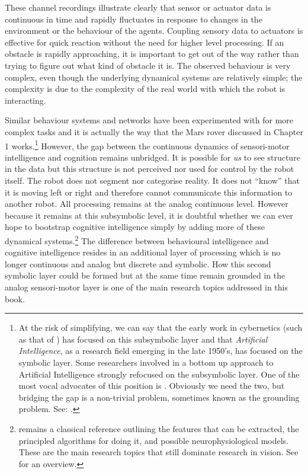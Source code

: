 These channel recordings illustrate clearly that sensor or actuator
data is continuous in time and 
rapidly fluctuates in response to changes in the environment or the
behaviour of the agents. Coupling sensory data to actuators
is effective for quick reaction
without the need for higher level processing. If 
an obstacle is rapidly approaching, it is important to get out 
of the way rather than trying to figure out what kind of 
obstacle it is. The observed behaviour is very complex, even though
the underlying dynamical systems are relatively 
simple; the complexity is due to the complexity of the 
real world with which the robot is interacting. 

Similar behaviour systems and networks have
been experimented with 
for more complex tasks and it is actually the way that 
the Mars rover discussed in Chapter 1 works.\footnote{At 
the risk of simplifying, we can say that the early 
work in cybernetics (such as that of \cite{Braitenberg:1984}) 
has focused on this subsymbolic layer
and that {\it Artificial Intelligence}, as a research field
emerging in the late 1950's, has focused on the 
symbolic layer. Some researchers involved in a bottom up 
approach to Artificial Intelligence strongly refocused
on the subsymbolic layer. One of the most
vocal advocates of this position is \cite{Brooks:1992}.
Obviously we need the two, 
but bridging the gap is a non-trivial problem, sometimes known 
as the grounding problem. See: \cite{Harnad:1994}. }
However, the gap between the continuous dynamics of sensori-motor
intelligence and cognition remains unbridged. 
It is possible for {\itshape us} to see 
structure in the data but this structure is not perceived
nor used for control by the robot itself. 
The robot does not segment nor categorise
reality. It does not ``know'' that it is moving left or right 
and therefore cannot communicate this information to another robot. 
All processing remains at the analog continuous
level. However because it remains at this subsymbolic level, it is doubtful
whether we can ever hope to bootstrap cognitive
intelligence simply by adding more of these dynamical 
systems.\footnote{
\cite{Marr:1982} remains a classical reference outlining
the features that can be extracted, the
principled algorithms for doing it, and possible 
neurophysiological models. These are the main research
topics that still dominate research in vision. See 
\cite{Ullman:1996} for an overview.}
The difference between behavioural intelligence 
and cognitive intelligence resides in an additional 
layer of processing which is no longer continuous and analog 
but discrete and symbolic. How this second symbolic 
layer could be formed but at the same time remain 
grounded in the analog sensori-motor layer is one 
of the main research topics addressed in this book. 

